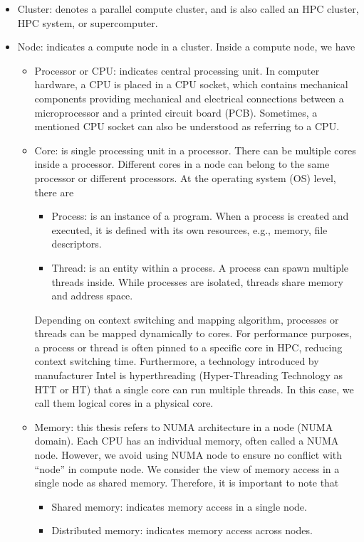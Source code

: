 \begin{itemize}
	\item Cluster: denotes a parallel compute cluster, and is also called an HPC cluster, HPC system, or supercomputer.
	
	\item Node: indicates a compute node in a cluster. Inside a compute node, we have
	\begin{itemize}
		\item Processor or CPU: indicates central processing unit. In computer hardware, a CPU is placed in a CPU socket, which contains mechanical components providing mechanical and electrical connections between a microprocessor and a printed circuit board (PCB). Sometimes, a mentioned CPU socket can also be understood as referring to a CPU.
		\item Core: is single processing unit in a processor. There can be multiple cores inside a processor. Different cores in a node can belong to the same processor or different processors. At the operating system (OS) level, there are
		\begin{itemize}
			\item Process: is an instance of a program. When a process is created and executed, it is defined with its own resources, e.g., memory, file descriptors.
			\item Thread: is an entity within a process. A process can spawn multiple threads inside. While processes are isolated, threads share memory and address space.
		\end{itemize}

		Depending on context switching and mapping algorithm, processes or threads can be mapped dynamically to cores. For performance purposes, a process or thread is often pinned to a specific core in HPC, reducing context switching time. Furthermore, a technology introduced by manufacturer Intel is hyperthreading (Hyper-Threading Technology as HTT or HT) that a single core can run multiple threads. In this case, we call them logical cores in a physical core.
		
	\item Memory: this thesis refers to NUMA architecture in a node (NUMA domain). Each CPU has an individual memory, often called a NUMA node. However, we avoid using NUMA node to ensure no conflict with ``node'' in compute node. We consider the view of memory access in a single node as shared memory. Therefore, it is important to note that
		\begin{itemize}
			\item Shared memory: indicates memory access in a single node.
			\item Distributed memory: indicates memory access across nodes.
		\end{itemize}
	\end{itemize}
	

\end{itemize}

